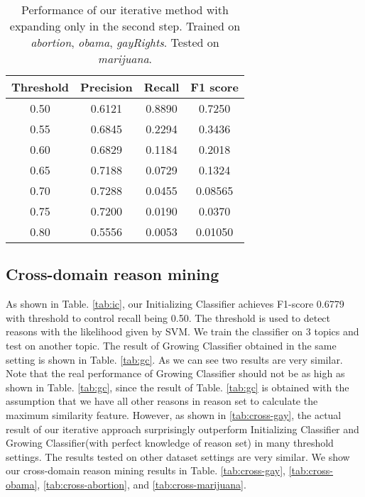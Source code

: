 \documentclass[11pt,a4paper]{article}
\begin{document}
\begin{table*}[h]
\begin{center}
\begin{tabular}{|c||c|c|c|}
\hline \bf Threshold & \bf Precision & \bf Recall & \bf F1 score \\ \hline\hline
0.50 & 0.6121 & 0.8890 & 0.7250 \\
0.55 & 0.6845 & 0.2294 & 0.3436 \\
0.60 & 0.6829 & 0.1184 & 0.2018 \\
0.65 & 0.7188 & 0.0729 & 0.1324 \\
0.70 & 0.7288 & 0.0455 & 0.08565 \\
0.75 & 0.7200 & 0.0190 & 0.0370 \\
0.80 & 0.5556 & 0.0053 & 0.01050 \\ 
\hline
\end{tabular}
\end{center}
\caption{\label{tab:expanding} Performance of our iterative method with expanding only in the second step. Trained on {\it abortion}, {\it obama}, {\it gayRights}. Tested on {\it marijuana}.}
\end{table*}

\subsection{Cross-domain reason mining}

As shown in Table. \ref{tab:ic}, our Initializing Classifier achieves F1-score 0.6779 with threshold to control recall being 0.50. The threshold is used to detect reasons with the likelihood given by SVM. We train the classifier on 3 topics and test on another topic. The result of Growing Classifier obtained in the same setting is shown in Table. \ref{tab:gc}. As we can see two results are very similar. Note that the real performance of Growing Classifier should not be as high as shown in Table. \ref{tab:gc}, since the result of Table. \ref{tab:gc} is obtained with the assumption that we have all other reasons in reason set to calculate the maximum similarity feature. However, as shown in \ref{tab:cross-gay}, the actual result of our iterative approach surprisingly outperform Initializing Classifier and Growing Classifier(with perfect knowledge of reason set) in many threshold settings. The results tested on other dataset settings are very similar. We show our cross-domain reason mining results in Table. \ref{tab:cross-gay}, \ref{tab:cross-obama}, \ref{tab:cross-abortion}, and \ref{tab:cross-marijuana}.
\end{document}

